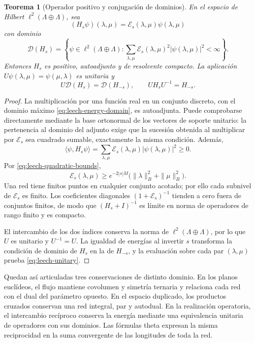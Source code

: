 \documentclass[a4paper,10pt]{article}
\newtheorem{theorem}{Teorema}[section]
\theoremstyle{definition}\newtheorem{definition}[theorem]{Definición}
\theoremstyle{remark}\newtheorem{remark}[theorem]{Observación}
\numberwithin{equation}{section}
\begin{document}
\begin{theorem}[Operador positivo y conjugación de dominios]
\label{thm:leech-energy}
En el espacio de Hilbert \(\ell^2(\Lambda\oplus\Lambda)\), sea
\[
 (H_s\psi)(\lambda,\mu)=
       \mathcal E_s(\lambda,\mu)\psi(\lambda,\mu)
\]
con dominio
\begin{equation}
 \mathcal D(H_s)=
 \left\{\psi\in\ell^2(\Lambda\oplus\Lambda):
 \sum_{\lambda,\mu}\mathcal E_s(\lambda,\mu)^2
             |\psi(\lambda,\mu)|^2<\infty\right\}.
 \label{eq:leech-energy-domain}
\end{equation}
Entonces \(H_s\) es positivo, autoadjunto y de resolvente compacto.
La aplicación \(U\psi(\lambda,\mu)=\psi(\mu,\lambda)\) es unitaria y
\begin{equation}
 U\mathcal D(H_s)=\mathcal D(H_{-s}),\qquad
 UH_sU^{-1}=H_{-s}.
 \label{eq:leech-unitary}
\end{equation}
\end{theorem}
\begin{proof}
La multiplicación por una función real en un conjunto discreto,
con el dominio máximo \eqref{eq:leech-energy-domain}, es
autoadjunta. Puede comprobarse directamente mediante la base
ortonormal de los vectores de soporte unitario: la pertenencia
al dominio del adjunto exige que la sucesión obtenida al
multiplicar por \(\mathcal E_s\) sea cuadrado sumable, exactamente
la misma condición. Además,
\[
 \langle\psi,H_s\psi\rangle
   =\sum_{\lambda,\mu}\mathcal E_s(\lambda,\mu)
                         |\psi(\lambda,\mu)|^2\geq0.
\]
Por \eqref{eq:leech-quadratic-bounds},
\[
 \mathcal E_s(\lambda,\mu)\geq
 e^{-2|s|M}\bigl(\|\lambda\|_B^2+\|\mu\|_B^2\bigr).
\]
Una red tiene finitos puntos en cualquier conjunto acotado; por
ello cada subnivel de \(\mathcal E_s\) es finito. Los coeficientes
diagonales \((1+\mathcal E_s)^{-1}\) tienden a cero fuera de
conjuntos finitos, de modo que \((H_s+I)^{-1}\) es límite en norma
de operadores de rango finito y es compacto.

El intercambio de los dos índices conserva la norma de
\(\ell^2(\Lambda\oplus\Lambda)\), por lo que \(U\) es unitario
y \(U^{-1}=U\). La igualdad de energías al invertir \(s\) transforma
la condición de dominio de \(H_s\) en la de \(H_{-s}\), y la
evaluación sobre cada par \((\lambda,\mu)\) prueba
\eqref{eq:leech-unitary}.
\end{proof}

Quedan así articuladas tres conservaciones de distinto dominio.
En los planos euclídeos, el flujo mantiene covolumen y simetría
ternaria y relaciona cada red con el dual del parámetro opuesto.
En el espacio duplicado, los productos cruzados conservan una
red integral, par y autodual. En la realización operatoria, el
intercambio recíproco conserva la energía mediante una equivalencia
unitaria de operadores con sus dominios. Las fórmulas theta
expresan la misma reciprocidad en la suma convergente de las
longitudes de toda la red.
\end{document}
